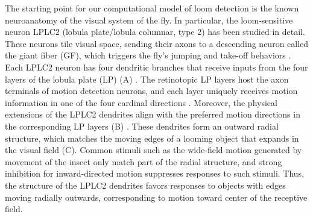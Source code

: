 \documentclass[pdftex,9pt,lineno]{elife}
\begin{document}
The starting point for our computational model of loom detection is the known neuroanatomy of the visual system of the fly. In particular, the loom-sensitive neuron LPLC2 (lobula plate/lobula columnar, type 2) \citep{wu2016visual} has been studied in detail. These neurons tile visual space, sending their axons to a descending neuron called the giant fiber (GF), which triggers  the fly's jumping and take-off behaviors \citep{tanouye1980motor,card2008visually,von2017feature,ache2019neural}. Each LPLC2 neuron has four dendritic branches that receive inputs from the four layers of the lobula plate (LP) (A) \citep{maisak2013directional,klapoetke2017ultra}. The retinotopic LP layers host the axon terminals of motion detection neurons, and each layer uniquely receives motion information in one of the four cardinal directions \citep{maisak2013directional}. Moreover, the physical extensions of the LPLC2 dendrites align with the preferred motion directions in the corresponding LP layers (B) \citep{klapoetke2017ultra}. These dendrites form an outward radial structure, which matches the moving edges of a looming object that expands in the visual field (C). Common stimuli such as the wide-field motion generated by movement of the insect only match part of the radial structure, and strong inhibition for inward-directed motion suppresses responses to such stimuli. Thus, the structure of the LPLC2 dendrites favors responses to objects with edges moving radially outwards, corresponding to motion toward center of the receptive field.
\end{document}

